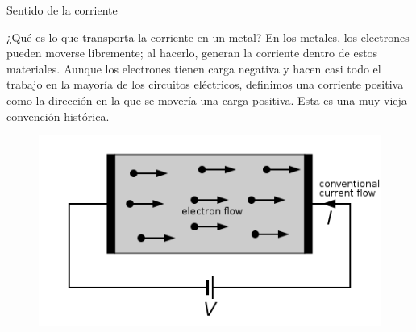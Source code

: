 \documentclass[10pt]{beamer}
\begin{document}
\begin{frame}{Sentido de la corriente}{}
\begin{block}{¿Qué es lo que transporta la corriente en un metal?}
En los metales, los electrones pueden moverse libremente; al hacerlo, generan la corriente dentro de estos materiales. Aunque los electrones tienen carga negativa y hacen casi todo el trabajo en la mayoría de los circuitos eléctricos, definimos una corriente positiva como la dirección en la que se movería una carga positiva. Esta es una muy vieja convención histórica.
\end{block}

\begin{figure}[h!]
\centering
\includegraphics [scale=0.45]{electronflow}
\label{fig:first}
\end{figure}
\end{frame}
\end{document}
